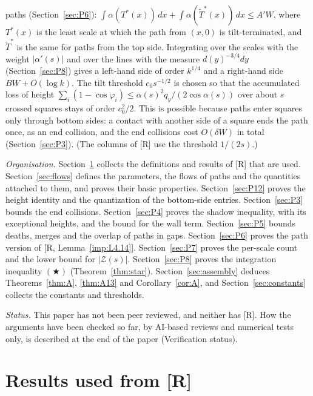 \documentclass[11pt]{amsart}
\newcommand{\Tstar}{T^{*}}
\theoremstyle{definition}
\theoremstyle{remark}
\numberwithin{equation}{section}
\begin{document}
paths (Section~\ref{sec:P6}): $\int\alpha(\Tstar(x))\,dx+\int\alpha(\tilde T^*(x))\,dx\le A'W$, where $\Tstar(x)$ is the
least scale at which the path from $(x,0)$ is tilt-terminated, and $\tilde T^*$ is the same for paths from the top side.
Integrating over the scales with the weight $|\alpha'(s)|$ and over the lines with the measure $d(y)^{-3/4}dy$
(Section~\ref{sec:P8}) gives a left-hand side of order $k^{1/4}$ and a right-hand side $BW+O(\log k)$. The tilt
threshold $c_0s^{-1/2}$ is chosen so that the accumulated loss of height
$\sum_i(1-\cos\varphi_i)\le\alpha(s)^2q_y/(2\cos\alpha(s))$ over about $s$ crossed squares stays of order $c_0^2/2$. This is possible because paths enter squares only through
bottom sides: a contact with another side of a square ends the path once, as an end collision, and the end collisions cost
$O(\delta W)$ in total (Section~\ref{sec:P3}). (The columns of [R] use the threshold $1/(2s)$.)

\emph{Organisation.} Section~\ref{sec:imported} collects the definitions and results of [R] that are used.
Section~\ref{sec:flows} defines the parameters, the flows of paths and the quantities attached to them, and proves their
basic properties. Section~\ref{sec:P12} proves the height identity and the quantization of the bottom-side entries.
Section~\ref{sec:P3} bounds the end collisions. Section~\ref{sec:P4} proves the shadow inequality, with its exceptional
heights, and the bound for the wall term. Section~\ref{sec:P5} bounds deaths, merges and the overlap of paths in gaps.
Section~\ref{sec:P6} proves the path version of [R, Lemma~\ref{imp:L4.14}]. Section~\ref{sec:P7} proves the per-scale
count and the lower bound for $|\mathcal Z(s)|$. Section~\ref{sec:P8} proves the integration inequality $(\bigstar)$
(Theorem~\ref{thm:star}).
Section~\ref{sec:assembly} deduces Theorems~\ref{thm:A}, \ref{thm:A13} and Corollary~\ref{cor:A}, and
Section~\ref{sec:constants} collects the constants and thresholds.

\emph{Status.} This paper has not been peer reviewed, and neither has [R]. How the arguments have been checked so far,
by AI-based reviews and numerical tests only, is described at the end of the paper (Verification status).

\section{Results used from [R]}\label{sec:imported}

\providecommand{\theHImpCount}{\arabic{ImpCount}}
\newenvironment{ImpStatement}[2]{\par\addvspace{\medskipamount}%
  \renewcommand{\theImpCount}{#2}\refstepcounter{ImpCount}%
  \noindent\textbf{#1~#2 of [R].}\ \itshape\ignorespaces}%
 {\par\addvspace{\medskipamount}}
\end{document}
